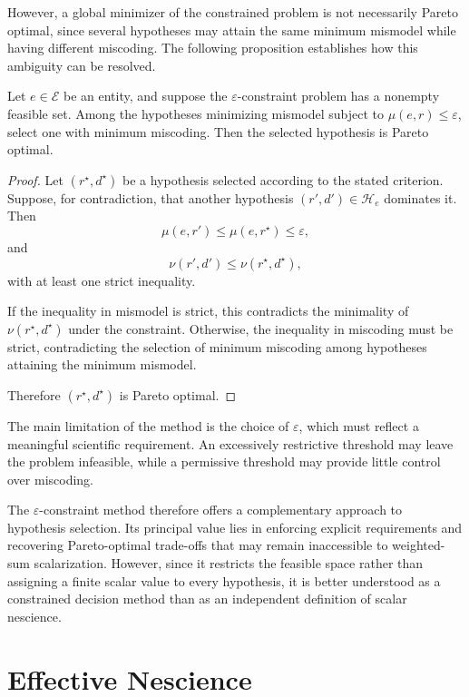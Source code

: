 However, a global minimizer of the constrained problem is not necessarily Pareto optimal, since several hypotheses may attain the same minimum mismodel while having different miscoding. The following proposition establishes how this ambiguity can be resolved.

\begin{proposition}
Let $e\in\mathcal E$ be an entity, and suppose the $\varepsilon$-constraint problem has a nonempty feasible set. Among the hypotheses minimizing mismodel subject to $\mu(e,r)\leq\varepsilon$, select one with minimum miscoding. Then the selected hypothesis is Pareto optimal.
\end{proposition}
\begin{proof}
Let $(r^\star,d^\star)$ be a hypothesis selected according to the stated criterion. Suppose, for contradiction, that another hypothesis $(r',d')\in\mathcal H_e$ dominates it. Then
\[
\mu(e,r')\leq\mu(e,r^\star)\leq\varepsilon,
\]
and
\[
\nu(r',d')\leq\nu(r^\star,d^\star),
\]
with at least one strict inequality.

If the inequality in mismodel is strict, this contradicts the minimality of $\nu(r^\star,d^\star)$ under the constraint. Otherwise, the inequality in miscoding must be strict, contradicting the selection of minimum miscoding among hypotheses attaining the minimum mismodel.

Therefore $(r^\star,d^\star)$ is Pareto optimal.
\end{proof}

The main limitation of the method is the choice of $\varepsilon$, which must reflect a meaningful scientific requirement. An excessively restrictive threshold may leave the problem infeasible, while a permissive threshold may provide little control over miscoding.

The $\varepsilon$-constraint method therefore offers a complementary approach to hypothesis selection. Its principal value lies in enforcing explicit requirements and recovering Pareto-optimal trade-offs that may remain inaccessible to weighted-sum scalarization. However, since it restricts the feasible space rather than assigning a finite scalar value to every hypothesis, it is better understood as a constrained decision method than as an independent definition of scalar nescience.

%
%

\section{Effective Nescience}
\label{sec:effective_nescience}

